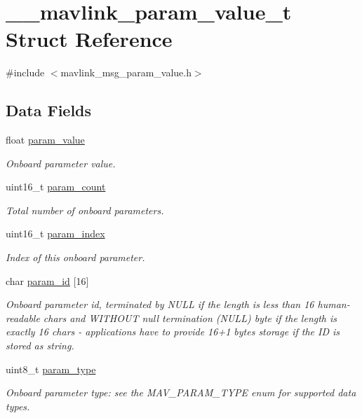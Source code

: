 \hypertarget{struct____mavlink__param__value__t}{\section{\+\_\+\+\_\+mavlink\+\_\+param\+\_\+value\+\_\+t Struct Reference}
\label{struct____mavlink__param__value__t}
}


{\ttfamily \#include $<$mavlink\+\_\+msg\+\_\+param\+\_\+value.\+h$>$}

\subsection*{Data Fields}
\begin{DoxyCompactItemize}
\item 
float \hyperlink{struct____mavlink__param__value__t_acd7d6401383f92dac17a95946b501a50}{param\+\_\+value}
\begin{DoxyCompactList}\small\item\em Onboard parameter value. \end{DoxyCompactList}\item 
uint16\+\_\+t \hyperlink{struct____mavlink__param__value__t_ab53bec8370ac590fc761b9a9de49f6b6}{param\+\_\+count}
\begin{DoxyCompactList}\small\item\em Total number of onboard parameters. \end{DoxyCompactList}\item 
uint16\+\_\+t \hyperlink{struct____mavlink__param__value__t_a213d71adbd95b241f962dd1d375c3a5a}{param\+\_\+index}
\begin{DoxyCompactList}\small\item\em Index of this onboard parameter. \end{DoxyCompactList}\item 
char \hyperlink{struct____mavlink__param__value__t_af686385ecc22c23ab4e2b5d115838119}{param\+\_\+id} \mbox{[}16\mbox{]}
\begin{DoxyCompactList}\small\item\em Onboard parameter id, terminated by N\+U\+L\+L if the length is less than 16 human-\/readable chars and W\+I\+T\+H\+O\+U\+T null termination (N\+U\+L\+L) byte if the length is exactly 16 chars -\/ applications have to provide 16+1 bytes storage if the I\+D is stored as string. \end{DoxyCompactList}\item 
uint8\+\_\+t \hyperlink{struct____mavlink__param__value__t_a825cfefbe7cfd71991186c4ffc897447}{param\+\_\+type}
\begin{DoxyCompactList}\small\item\em Onboard parameter type\+: see the M\+A\+V\+\_\+\+P\+A\+R\+A\+M\+\_\+\+T\+Y\+P\+E enum for supported data types. \end{DoxyCompactList}\end{DoxyCompactItemize}


